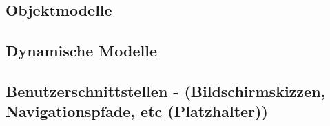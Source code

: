 \subsection{Objektmodelle}

\subsection{Dynamische Modelle}

\subsection{Benutzerschnittstellen - (Bildschirmskizzen, Navigationspfade, etc (Platzhalter))}